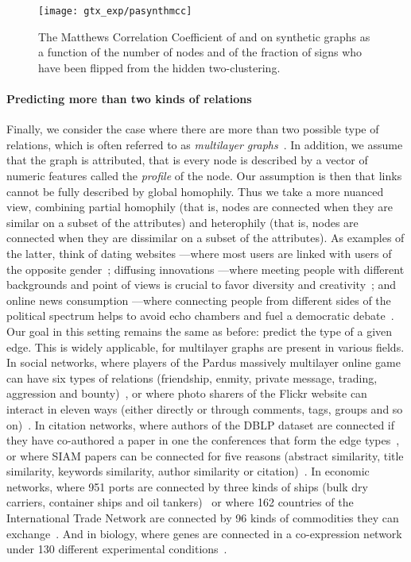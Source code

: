 \begin{figure}[phtb]
  \centering
  \texttt{[image: gtx\_exp/pasynthmcc]}
  \caption{The Matthews Correlation Coefficient of \bfs{} and \gtx{} on synthetic \lpa{} graphs as a
    function of the number of nodes and of the fraction of signs who have been flipped from the
    hidden two-clustering.  \label{fig:gtx_xp_pasynthmcc}}
\end{figure}

\vspace{-\baselineskip}
\paragraph{Predicting more than two kinds of relations}

Finally, we consider the case where there are more than two possible type of relations, which is
often referred to as \emph{multilayer graphs}~\autocites{Kivela2014}{multiSurvey14}. In addition, we assume
that the graph is attributed, that is every node is described by a vector of numeric features called
the \emph{profile} of the node. Our assumption is then that links cannot be fully described by
global homophily. Thus we take a more nuanced view, combining partial homophily (that is, nodes are
connected when they are similar on a subset of the attributes) and heterophily (that is, nodes are
connected when they are dissimilar on a subset of the attributes). As examples of the latter, think
of dating websites ---where most users are linked with users of the opposite
gender~\autocites{homophilyMyspace09}{Tinder16}; diffusing innovations ---where meeting people with
different backgrounds and point of views is crucial to favor diversity and
creativity~\autocite{rogers2003diffusion}; and online news consumption ---where connecting people
from different sides of the political spectrum helps to avoid echo chambers and fuel a democratic
debate~\autocite{balancedNews17}. Our goal in this setting remains the same as before: predict the
type of a given edge. This is
widely applicable, for multilayer graphs are present  in various fields. In social networks, where
players of the Pardus massively multilayer online game can have six types of relations (friendship,
enmity, private message, trading, aggression and bounty)~\autocite{Szell2010}, or where photo sharers
of the Flickr website can interact in eleven ways (either directly or through comments, tags, groups
and so on)~\autocite{RecoFlickrMulti11}. In citation networks, where authors of the DBLP dataset are
connected if they have co-authored a paper in one the  conferences that form the edge
types~\autocite{communityDBLPbyConf05}, or where  SIAM papers can be connected for five
reasons (abstract similarity, title similarity, keywords similarity, author similarity or
citation)~\autocite{articlesMultiSim11}. In economic networks, where 951 ports are connected by three
kinds of ships (bulk dry carriers, container ships and oil tankers)~\autocite{ports3kindofships10} or
where 162 countries of the International Trade Network are connected by 96 kinds of commodities they
can exchange~\autocite{worldTradeNetwork10}. And in biology, where genes are connected in a
co-expression network under 130 different experimental conditions~\autocite{bioLayerExp11}.

